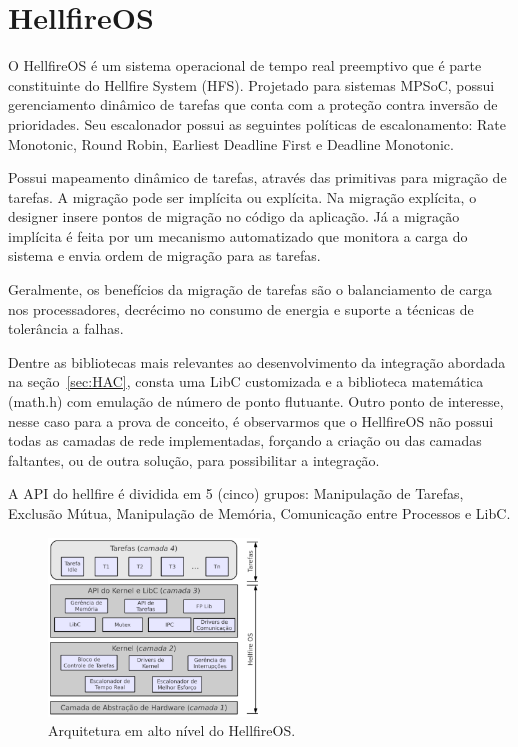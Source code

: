 \section{HellfireOS}
\label{sec:HellfireOS}
O HellfireOS é um sistema operacional de tempo real preemptivo que é parte constituinte
do Hellfire System (HFS). Projetado para sistemas MPSoC, possui gerenciamento
dinâmico de tarefas que conta com a proteção contra inversão de prioridades. Seu escalonador
possui as seguintes políticas de escalonamento: Rate Monotonic, Round Robin, Earliest Deadline First e
Deadline Monotonic.

Possui mapeamento dinâmico de tarefas, através das primitivas para migração de tarefas. A migração pode
ser implícita ou explícita. Na migração explícita, o designer insere pontos de migração no código
da aplicação. Já a migração implícita é feita por um mecanismo automatizado que monitora a carga do
sistema e envia ordem de migração para as tarefas.

Geralmente, os benefícios da migração de tarefas são o balanciamento de carga nos processadores, decrécimo
no consumo de energia e suporte a técnicas de tolerância a falhas.

Dentre as bibliotecas mais relevantes ao desenvolvimento da integração abordada na seção~\ref{sec:HAC},
consta uma LibC customizada e a biblioteca matemática (math.h) com emulação de número de ponto
flutuante. Outro ponto de interesse, nesse caso para a prova de conceito, é observarmos
que o HellfireOS não possui todas as camadas de rede implementadas, forçando a criação
ou das camadas faltantes, ou de outra solução, para possibilitar a integração.

A API do hellfire é dividida em 5 (cinco) grupos: Manipulação de Tarefas, Exclusão Mútua,
Manipulação de Memória, Comunicação entre Processos e LibC.

\begin{figure}[H]
	\centering
		\includegraphics[width=0.5\textwidth]{fig/HellfireArch.png}
	\caption{Arquitetura em alto nível do HellfireOS.}
\end{figure}

